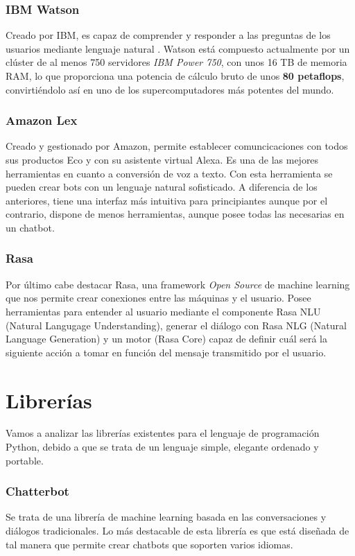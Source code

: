 \subsubsection{IBM Watson}
Creado por IBM, es capaz de comprender y responder a las preguntas de los usuarios mediante lenguaje natural \cite{MicrosoftBotBuilder}. Watson está compuesto actualmente por un clúster de al menos 750 servidores \textit{IBM Power 750}, con unos 16 TB de memoria RAM, lo que proporciona una potencia de cálculo bruto de unos \textbf{80 petaflops}, convirtiéndolo así en uno de los supercomputadores más potentes del mundo. 

\subsubsection{Amazon Lex}
Creado y gestionado por Amazon, permite establecer comuncicaciones con todos sus productos Eco y con su asistente virtual Alexa. Es una de las mejores herramientas en cuanto a conversión de voz a texto. Con esta herramienta se pueden crear bots con un lenguaje natural sofisticado. A diferencia de los anteriores, tiene una interfaz más intuitiva para principiantes aunque por el contrario, dispone de menos herramientas, aunque posee todas las necesarias en un chatbot.

\subsubsection{Rasa}
Por último cabe destacar Rasa, una framework \textit{Open Source} de machine learning que nos permite crear conexiones entre las máquinas y el usuario. Posee herramientas para entender al usuario mediante el componente Rasa NLU (Natural Langugage Understanding), generar el diálogo con Rasa NLG (Natural Language Generation) y un motor (Rasa Core) capaz de definir cuál será la siguiente acción a tomar en función del mensaje transmitido por el usuario.   


\section{Librerías}
Vamos a analizar las librerías existentes para el lenguaje de programación Python, debido a que se trata de un lenguaje simple, elegante ordenado y portable.

\subsubsection{Chatterbot}
Se trata de una librería de machine learning basada en las conversaciones y diálogos tradicionales. Lo más destacable de esta librería es que está diseñada de tal manera que permite crear chatbots que soporten varios idiomas. 

